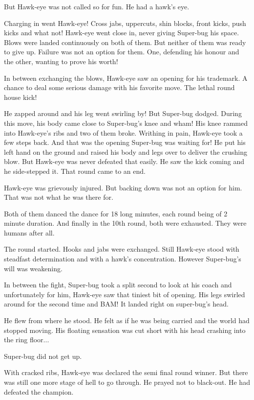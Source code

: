 \documentclass[twoside,11pt,titlepage]{article}
\begin{document}
But Hawk-eye was not called so for fun. He had a hawk's eye.

Charging in went Hawk-eye! Cross jabs, uppercuts, shin blocks, front kicks, push kicks and what not! Hawk-eye went close in, never giving Super-bug his space. Blows were landed continuously on both of them. But neither of them was ready to give up. Failure was not an option for them. One, defending his honour and the other, wanting to prove his worth!

In between exchanging the blows, Hawk-eye saw an opening for his trademark. A chance to deal some serious damage with his favorite move. The lethal round house kick!

He zapped around and his leg went swirling by! But Super-bug dodged. During this move, his body came close to Super-bug's knee and wham! His knee rammed into Hawk-eye's ribs and two of them broke. Writhing in pain, Hawk-eye took a few steps back. And that was the opening Super-bug was waiting for! He put his left hand on the ground and raised his body and legs over to deliver the crushing blow. But Hawk-eye was never defeated that easily. He saw the kick coming and he side-stepped it. That round came to an end.

Hawk-eye was grievously injured. But backing down was not an option for him. That was not what he was there for.

Both of them danced the dance for 18 long minutes, each round being of 2 minute duration. And finally in the 10th round, both were exhausted. They were humans after all.

The round started. Hooks and jabs were exchanged. Still Hawk-eye stood with steadfast determination and with a hawk's concentration. However Super-bug's will was weakening.

In between the fight, Super-bug took a split second to look at his coach and unfortunately for him, Hawk-eye saw that tiniest bit of opening. His legs swirled around for the second time and BAM! It landed right on super-bug's head.

He flew from where he stood. He felt as if he was being carried and the world had stopped moving. His floating sensation was cut short with his head crashing into the ring floor...

Super-bug did not get up.

With cracked ribs, Hawk-eye was declared the semi final round winner. But there was still one more stage of hell to go through. He prayed not to black-out. He had defeated the champion.
\end{document}
